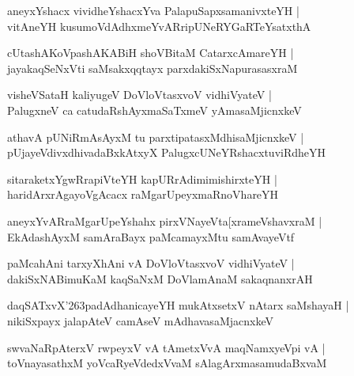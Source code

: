 \documentclass[twoside,12pt,openright]{book}
\def\S{\char'263}
\newcounter{shloka}[chapter]
\begin{document}
\begin{shloka}%
aneyxYshacx vividheYshacxYva PalapuSapxsamanivxteYH |\\
vitAneYH kusumoVdAdhxmeYvARripUNeRYGaRTeYsatxthA 
\end{shloka}

\begin{shloka}%
cUtashAKoVpashAKABiH shoVBitaM CatarxcAmareYH |\\
jayakaqSeNxVti saMsakxqqtayx parxdakiSxNapurasasxraM
\end{shloka}

\begin{shloka}%
visheVSataH kaliyugeV DoVloVtasxvoV vidhiVyateV |\\
PalugxneV ca catudaRshAyxmaSaTxmeV yAmasaMjicnxkeV 
\end{shloka}

\begin{shloka}%
athavA pUNiRmAsAyxM tu parxtipatasxMdhisaMjicnxkeV |\\
pUjayeVdivxdhivadaBxkAtxyX PalugxcUNeYRshacxtuviRdheYH
\end{shloka}

\begin{shloka}%
sitaraketxYgwRrapiVteYH kapURrAdimimishirxteYH |\\
haridArxrAgayoVgAcacx raMgarUpeyxmaRnoVhareYH
\end{shloka}

\begin{shloka}%
aneyxYvARraMgarUpeYshahx pirxVNayeVta[xrameVshavxraM |\\
EkAdashAyxM samAraBayx paMcamayxMtu samAvayeVtf 
\end{shloka}

\begin{shloka}%
paMcahAni tarxyXhAni vA DoVloVtasxvoV vidhiVyateV |\\
dakiSxNABimuKaM kaqSaNxM  DoVlamAnaM  sakaqnanxrAH 
\end{shloka}

\begin{shloka}%
daqSATxvX\S padAdhanicayeYH mukAtxsetxV nAtarx saMshayaH |\\
nikiSxpayx jalapAteV camAseV mAdhavasaMjacnxkeV  
\end{shloka}

\begin{shloka}%
swvaNaRpAterxV rwpeyxV vA tAmetxVvA maqNamxyeVpi vA |\\
toVnayasathxM yoVcaRyeVdedxVvaM sAlagArxmasamudaBxvaM 
\end{shloka}
\end{document}
